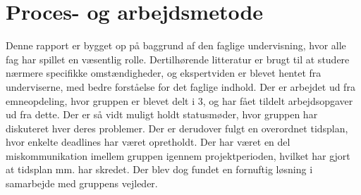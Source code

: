 \section{Proces- og arbejdsmetode}
Denne rapport er bygget op på baggrund af den faglige undervisning, hvor alle fag har spillet en væsentlig rolle. Dertilhørende litteratur er brugt til at studere nærmere specifikke omstændigheder, og ekspertviden er blevet hentet fra underviserne, med bedre forståelse for det faglige indhold. Der er arbejdet ud fra emneopdeling, hvor gruppen er blevet delt i 3, og har fået tildelt arbejdsopgaver ud fra dette. Der er så vidt muligt holdt statusmøder, hvor gruppen har diskuteret hver deres problemer. Der er derudover fulgt en overordnet tidsplan, hvor enkelte deadlines har været opretholdt. Der har været en del miskommunikation imellem gruppen igennem projektperioden, hvilket har gjort at tidsplan mm. har skredet. Der blev dog fundet en fornuftig løsning i samarbejde med gruppens vejleder.




